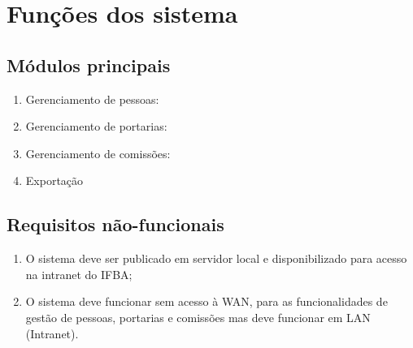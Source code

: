 \documentclass{scrreprt}
\begin{document}
\chapter{Funções dos sistema}

\section{Módulos principais}
\begin{enumerate}
    \item Gerenciamento de pessoas:
    \item Gerenciamento de portarias:
    \item Gerenciamento de comissões:
    \item Exportação
\end{enumerate}


\section{Requisitos não-funcionais}


\begin{enumerate}[label=\textbf{RF-\arabic*}]
\item
O sistema deve ser publicado em servidor local e disponibilizado para acesso na intranet do IFBA;

\item
O sistema deve funcionar sem acesso à WAN, para as funcionalidades de gestão de pessoas, portarias e comissões mas deve funcionar em LAN (Intranet).
\end{enumerate}
\end{document}
